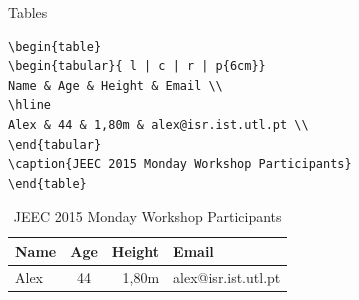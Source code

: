 \documentclass{beamer}
\begin{document}
\begin{frame}[fragile]{Tables}
\begin{lstlisting}
\begin{table}
\begin{tabular}{ l | c | r | p{6cm}}
Name & Age & Height & Email \\
\hline
Alex & 44 & 1,80m & alex@isr.ist.utl.pt \\
\end{tabular}
\caption{JEEC 2015 Monday Workshop Participants}
\end{table}
\end{lstlisting}
\begin{table}
\begin{tabular}{ l | c | r | p{6cm}}
Name & Age & Height & Email \\
\hline
Alex & 44 & 1,80m & alex@isr.ist.utl.pt \\
\end{tabular}
\caption{JEEC 2015 Monday Workshop Participants}
\end{table}
\end{frame}
\end{document}
